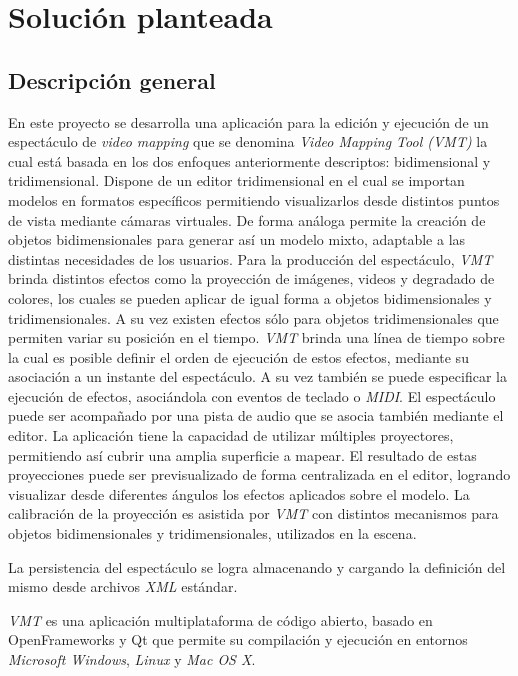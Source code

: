 \chapter{Solución planteada}
\section{Descripción general}

En este proyecto se desarrolla una aplicación para la edición y ejecución de un espectáculo de \emph{video mapping} que se denomina \emph{Video Mapping Tool (VMT)} la cual está basada en los dos enfoques anteriormente descriptos: bidimensional y tridimensional.
Dispone de un editor tridimensional en el cual se importan modelos en formatos específicos permitiendo visualizarlos desde distintos puntos de vista mediante cámaras virtuales. De forma análoga permite la creación de objetos bidimensionales para generar así un modelo mixto, adaptable a las distintas necesidades de los usuarios.
Para la producción del espectáculo, \emph{VMT} brinda distintos efectos como la proyección de imágenes, videos y degradado de colores, los cuales se pueden aplicar de igual forma a objetos bidimensionales y tridimensionales. A su vez existen efectos sólo para objetos tridimensionales que permiten variar su posición en el tiempo.
\emph{VMT} brinda una línea de tiempo sobre la cual es posible definir el orden de ejecución de estos efectos, mediante su asociación a un instante del espectáculo. A su vez también se puede especificar la ejecución de efectos, asociándola con eventos de teclado o \emph{MIDI}.
El espectáculo puede ser acompañado por una pista de audio que se asocia también mediante el editor.
La aplicación tiene la capacidad de utilizar múltiples proyectores, permitiendo así cubrir una amplia superficie a mapear. El resultado de estas proyecciones puede ser previsualizado de forma centralizada en el editor, logrando visualizar desde diferentes ángulos los efectos aplicados sobre el modelo.
La calibración de la proyección es asistida por \emph{VMT} con distintos mecanismos para objetos bidimensionales y tridimensionales, utilizados en la escena.

La persistencia del espectáculo se logra almacenando y cargando la definición del mismo desde archivos \emph{XML} estándar.

\emph{VMT} es una aplicación multiplataforma de código abierto, basado en OpenFrameworks y Qt que permite su compilación y ejecución en entornos \emph{Microsoft Windows}, \emph{Linux} y \emph{Mac OS X}.%

